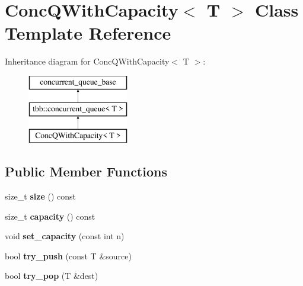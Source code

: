 \hypertarget{classConcQWithCapacity}{}\section{Conc\+Q\+With\+Capacity$<$ T $>$ Class Template Reference}
\label{classConcQWithCapacity}
Inheritance diagram for Conc\+Q\+With\+Capacity$<$ T $>$\+:\begin{figure}[H]
\begin{center}
\leavevmode
\includegraphics[height=3.000000cm]{classConcQWithCapacity}
\end{center}
\end{figure}
\subsection*{Public Member Functions}
\begin{DoxyCompactItemize}
\item 
\hypertarget{classConcQWithCapacity_aa9cfeecae0b7dab95af2af1e846a7a10}{}size\+\_\+t {\bfseries size} () const \label{classConcQWithCapacity_aa9cfeecae0b7dab95af2af1e846a7a10}

\item 
\hypertarget{classConcQWithCapacity_af449ba7b3533c3bb53157fe8bb60ab6c}{}size\+\_\+t {\bfseries capacity} () const \label{classConcQWithCapacity_af449ba7b3533c3bb53157fe8bb60ab6c}

\item 
\hypertarget{classConcQWithCapacity_a74f95ef38392d82fa8e86bcbbc09eb0a}{}void {\bfseries set\+\_\+capacity} (const int n)\label{classConcQWithCapacity_a74f95ef38392d82fa8e86bcbbc09eb0a}

\item 
\hypertarget{classConcQWithCapacity_ad7540dfc1113c845da4ad3cd07dacb68}{}bool {\bfseries try\+\_\+push} (const T \&source)\label{classConcQWithCapacity_ad7540dfc1113c845da4ad3cd07dacb68}

\item 
\hypertarget{classConcQWithCapacity_a15797160a2c86535fb4b18f932096da7}{}bool {\bfseries try\+\_\+pop} (T \&dest)\label{classConcQWithCapacity_a15797160a2c86535fb4b18f932096da7}

\end{DoxyCompactItemize}
